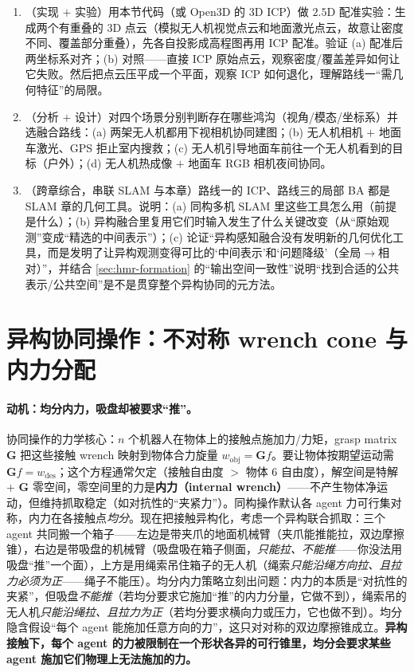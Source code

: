 \begin{practice}
\begin{enumerate}
  \item （实现 $+$ 实验）用本节代码（或 Open3D 的 3D ICP）做 $2.5\mathrm{D}$ 配准实验：生成两个有重叠的 3D 点云（模拟无人机视觉点云和地面激光点云，故意让密度不同、覆盖部分重叠），先各自投影成高程图再用 ICP 配准。验证 (a) 配准后两坐标系对齐；(b) 对照——直接 ICP 原始点云，观察密度/覆盖差异如何让它失败。然后把点云压平成一个平面，观察 ICP 如何退化，理解路线一“需几何特征”的局限。
  \item （分析 $+$ 设计）对四个场景分别判断存在哪些鸿沟（视角/模态/坐标系）并选融合路线：(a) 两架无人机都用下视相机协同建图；(b) 无人机相机 $+$ 地面车激光、GPS 拒止室内搜救；(c) 无人机引导地面车前往一个无人机看到的目标（户外）；(d) 无人机热成像 $+$ 地面车 RGB 相机夜间协同。
  \item （跨章综合，串联 SLAM 与本章）路线一的 ICP、路线三的局部 BA 都是 SLAM 章的几何工具。说明：(a) 同构多机 SLAM 里这些工具怎么用（前提是什么）；(b) 异构融合里复用它们时输入发生了什么关键改变（从“原始观测”变成“精选的中间表示”）；(c) 论证“异构感知融合没有发明新的几何优化工具，而是发明了让异构观测变得可比的‘中间表示’和‘问题降级’（全局$\to$相对）”，并结合 \cref{sec:hmr-formation} 的“输出空间一致性”说明“找到合适的公共表示/公共空间”是不是贯穿整个异构协同的元方法。
\end{enumerate}
\end{practice}

\section{异构协同操作：不对称 wrench cone 与内力分配}
\label{sec:hmr-manip}

\paragraph{动机：均分内力，吸盘却被要求“推”。}
协同操作的力学核心：$n$ 个机器人在物体上的接触点施加力/力矩，grasp matrix $\mathbf{G}$ 把这些接触 wrench 映射到物体合力旋量 $w_{\mathrm{obj}}=\mathbf{G}f$。要让物体按期望运动需 $\mathbf{G}f=w_{\mathrm{des}}$；这个方程通常欠定（接触自由度 $>$ 物体 $6$ 自由度），解空间是特解 $+$ $\mathbf{G}$ 零空间，零空间里的力是\textbf{内力（internal wrench）}——不产生物体净运动，但维持抓取稳定（如对抗性的“夹紧力”）。同构操作默认各 agent 力可行集对称，内力在各接触点\emph{均分}。现在把接触异构化，考虑一个异构联合抓取：三个 agent 共同搬一个箱子——左边是带夹爪的地面机械臂（夹爪能推能拉，双边摩擦锥），右边是带吸盘的机械臂（吸盘吸在箱子侧面，\emph{只能拉、不能推}——你没法用吸盘“推”一个面），上方是用绳索吊住箱子的无人机（绳索\emph{只能沿绳方向拉、且拉力必须为正}——绳子不能压）。均分内力策略立刻出问题：内力的本质是“对抗性的夹紧”，但吸盘\emph{不能推}（若均分要求它施加“推”的内力分量，它做不到），绳索吊的无人机\emph{只能沿绳拉、且拉力为正}（若均分要求横向力或压力，它也做不到）。均分隐含假设“每个 agent 能施加任意方向的力”，这只对对称的双边摩擦锥成立。\textbf{异构接触下，每个 agent 的力被限制在一个形状各异的可行锥里，均分会要求某些 agent 施加它们物理上无法施加的力。}

